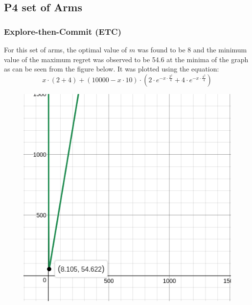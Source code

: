 \documentclass[12pt]{report}
\begin{document}
	\subsection{P4 set of Arms}
		\subsubsection{Explore-then-Commit (ETC)}
			For this set of arms, the optimal value of $m$ was found to be 8 and the minimum value of the maximum regret was observed to be 54.6 at the minima of the graph as can be seen from the figure below. It was plotted using the equation:
			$$x\cdot\left(2+4\right)+\left(10000-x\cdot10\right)\cdot\left(2\cdot e^{-x\cdot\frac{2^2}{4}}+4\cdot e^{-x\cdot\frac{4^2}{4}}\right)$$
			
			\begin{figure}[H]
				\includegraphics[scale=0.5]{Figures/m_P4.png}
			\end{figure}
			
\end{document}
